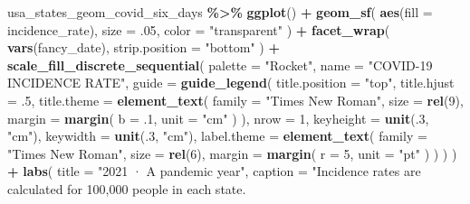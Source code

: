 \documentclass[
]{book}
\newenvironment{Shaded}{\begin{snugshade}}{\end{snugshade}}
\newcommand{\AttributeTok}[1]{\textcolor[rgb]{0.13,0.29,0.53}{#1}}
\newcommand{\DecValTok}[1]{\textcolor[rgb]{0.00,0.00,0.81}{#1}}
\newcommand{\FunctionTok}[1]{\textcolor[rgb]{0.13,0.29,0.53}{\textbf{#1}}}
\newcommand{\NormalTok}[1]{#1}
\newcommand{\SpecialCharTok}[1]{\textcolor[rgb]{0.81,0.36,0.00}{\textbf{#1}}}
\newcommand{\StringTok}[1]{\textcolor[rgb]{0.31,0.60,0.02}{#1}}
\begin{document}
\begin{Shaded}
\begin{Highlighting}[]
\NormalTok{usa\_states\_geom\_covid\_six\_days }\SpecialCharTok{\%\textgreater{}\%}
  \FunctionTok{ggplot}\NormalTok{() }\SpecialCharTok{+}
  \FunctionTok{geom\_sf}\NormalTok{(}
    \FunctionTok{aes}\NormalTok{(}\AttributeTok{fill =}\NormalTok{ incidence\_rate),}
    \AttributeTok{size =}\NormalTok{ .}\DecValTok{05}\NormalTok{,}
    \AttributeTok{color =} \StringTok{"transparent"}
\NormalTok{  ) }\SpecialCharTok{+}
  \FunctionTok{facet\_wrap}\NormalTok{(}
    \FunctionTok{vars}\NormalTok{(fancy\_date),}
    \AttributeTok{strip.position =} \StringTok{"bottom"}
\NormalTok{  ) }\SpecialCharTok{+}
  \FunctionTok{scale\_fill\_discrete\_sequential}\NormalTok{(}
    \AttributeTok{palette =} \StringTok{"Rocket"}\NormalTok{,}
    \AttributeTok{name =} \StringTok{"COVID{-}19 INCIDENCE RATE"}\NormalTok{,}
    \AttributeTok{guide =} \FunctionTok{guide\_legend}\NormalTok{(}
      \AttributeTok{title.position =} \StringTok{"top"}\NormalTok{,}
      \AttributeTok{title.hjust =}\NormalTok{ .}\DecValTok{5}\NormalTok{,}
      \AttributeTok{title.theme =} \FunctionTok{element\_text}\NormalTok{(}
        \AttributeTok{family =} \StringTok{"Times New Roman"}\NormalTok{,}
        \AttributeTok{size =} \FunctionTok{rel}\NormalTok{(}\DecValTok{9}\NormalTok{),}
        \AttributeTok{margin =} \FunctionTok{margin}\NormalTok{(}
          \AttributeTok{b =}\NormalTok{ .}\DecValTok{1}\NormalTok{,}
          \AttributeTok{unit =} \StringTok{"cm"}
\NormalTok{        )}
\NormalTok{      ),}
      \AttributeTok{nrow =} \DecValTok{1}\NormalTok{,}
      \AttributeTok{keyheight =} \FunctionTok{unit}\NormalTok{(.}\DecValTok{3}\NormalTok{, }\StringTok{"cm"}\NormalTok{),}
      \AttributeTok{keywidth =} \FunctionTok{unit}\NormalTok{(.}\DecValTok{3}\NormalTok{, }\StringTok{"cm"}\NormalTok{),}
      \AttributeTok{label.theme =} \FunctionTok{element\_text}\NormalTok{(}
        \AttributeTok{family =} \StringTok{"Times New Roman"}\NormalTok{,}
        \AttributeTok{size =} \FunctionTok{rel}\NormalTok{(}\DecValTok{6}\NormalTok{),}
        \AttributeTok{margin =} \FunctionTok{margin}\NormalTok{(}
          \AttributeTok{r =} \DecValTok{5}\NormalTok{,}
          \AttributeTok{unit =} \StringTok{"pt"}
\NormalTok{        )}
\NormalTok{      )}
\NormalTok{    )}
\NormalTok{  ) }\SpecialCharTok{+}
  \FunctionTok{labs}\NormalTok{(}
    \AttributeTok{title =} \StringTok{"2021 · A pandemic year"}\NormalTok{,}
    \AttributeTok{caption =} \StringTok{"Incidence rates are calculated for 100,000 people in each state.}

\end{Highlighting}
\end{Shaded}
\end{document}

